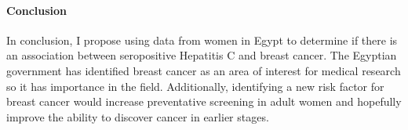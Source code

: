 \documentclass[12pt]{article}
\begin{document}
\paragraph{Conclusion}
In conclusion, I propose using data from women in Egypt to determine if there is an association between seropositive Hepatitis C and 
breast cancer. The Egyptian government has identified breast cancer as an area of interest for medical research so it has importance in
the field. Additionally, identifying a new risk factor for breast cancer would increase preventative screening in adult women and hopefully 
improve the ability to discover cancer in earlier stages. 





\end{document}
